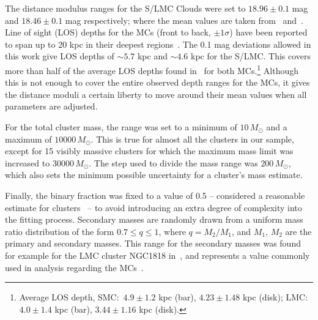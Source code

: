 \documentclass[draft]{aa}
\begin{document}
The distance modulus ranges for the S/LMC Clouds were set to
$18.96\pm0.1$ mag and $18.46\pm0.1$ mag respectively; where the mean values
are taken from~\cite{de_Grijs_2015} and~\cite{de_Grijs_2014}.
%
Line of sight (LOS) depths for the MCs (front to back, $\pm1\sigma$) have been
reported to span up to 20 kpc in their deepest
regions~\citep{Subramanian_2009,Nidever_2013,Scowcroft_2015}.
%
The 0.1 mag deviations allowed in this work give LOS depths of ${\sim}5.7$ kpc
and ${\sim}4.6$ kpc for the S/LMC\@. This covers more than half of the average
LOS depths found in~\cite{Subramanian_2009} for both MCs.\footnote
{Average LOS depth, SMC:\ $4.9\pm1.2$ kpc (bar), $4.23\pm1.48$ kpc 
(disk); LMC:\ $4.0\pm1.4$ kpc (bar), $3.44\pm1.16$ kpc (disk).}
Although this is not enough to cover the entire observed depth ranges for the
MCs, it gives the distance moduli a certain liberty to move around their mean
values when all parameters are adjusted.

For the total cluster mass, the range was set to a minimum of
$10\,M_ {\odot}$ and a maximum of $10000\,M_{\odot}$. This is true for almost
all the clusters in our sample, except for 15 visibly massive clusters for
which the maximum mass limit was increased to $30000\,M_{\odot}$.
The step used to divide the mass range was $200\,M_{\odot}$, which also sets the
minimum possible uncertainty for a cluster's mass estimate.

Finally, the binary fraction was fixed to a value of 0.5 -- considered a
reasonable estimate for clusters~\citep{von_Hippel_2005,Sollima_2010} -- to avoid
introducing an extra degree of complexity into the fitting process. Secondary
masses are randomly drawn from a uniform mass ratio distribution of the form
$0.7{\le}q{\le}1$, where $q{=}M_2/M_1$, and $M_1$, $M_2$ are the primary and
secondary masses. This range for the secondary masses was found for example for
the LMC cluster NGC1818 in~\cite{Elson_1998}, and represents a value commonly
used in analysis regarding the
MCs~\citep[see][and references therein]{Rubele_2011}.
\end{document}
